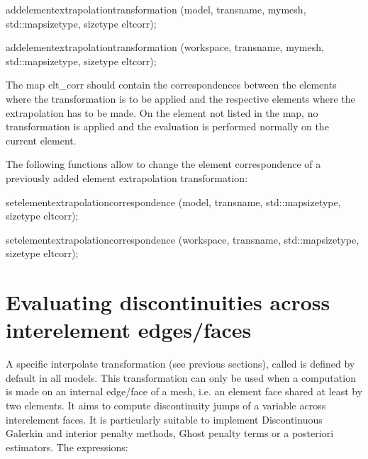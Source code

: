 \documentclass[a4paper,11pt,english]{sphinxmanual}
\begin{document}
\begin{sphinxVerbatim}[commandchars=\\\{\}]
add\PYGZus{}element\PYGZus{}extrapolation\PYGZus{}transformation
(model, transname, my\PYGZus{}mesh, std::map\PYGZlt{}size\PYGZus{}type, size\PYGZus{}type\PYGZgt{} \PYGZam{}elt\PYGZus{}corr);

add\PYGZus{}element\PYGZus{}extrapolation\PYGZus{}transformation
(workspace, transname, my\PYGZus{}mesh, std::map\PYGZlt{}size\PYGZus{}type, size\PYGZus{}type\PYGZgt{} \PYGZam{}elt\PYGZus{}corr);
\end{sphinxVerbatim}

The map elt\_corr should contain the correspondences between the elements where the transformation is to be applied and the respective elements where the extrapolation has to be made. On the element not listed in the map, no transformation is applied and the evaluation is performed normally on the current element.

The following functions allow to change the element correspondence of a previously added element extrapolation transformation:

\begin{sphinxVerbatim}[commandchars=\\\{\}]
set\PYGZus{}element\PYGZus{}extrapolation\PYGZus{}correspondence
(model, transname, std::map\PYGZlt{}size\PYGZus{}type, size\PYGZus{}type\PYGZgt{} \PYGZam{}elt\PYGZus{}corr);

set\PYGZus{}element\PYGZus{}extrapolation\PYGZus{}correspondence
(workspace, transname, std::map\PYGZlt{}size\PYGZus{}type, size\PYGZus{}type\PYGZgt{} \PYGZam{}elt\PYGZus{}corr);
\end{sphinxVerbatim}


\section{Evaluating discontinuities across inter\sphinxhyphen{}element edges/faces}
\label{\detokenize{userdoc/gasm_high:evaluating-discontinuities-across-inter-element-edges-faces}}\label{\detokenize{userdoc/gasm_high:ud-gasm-high-inter-elt-disc}}
A specific interpolate transformation (see previous sections), called  is defined by default in all models. This transformation can only be used when a computation is made on an internal edge/face of a mesh, i.e. an element face shared at least by two elements. It aims to compute discontinuity jumps of a variable across inter\sphinxhyphen{}element faces. It is particularly suitable to implement Discontinuous Galerkin and interior penalty methods, Ghost penalty terms or a posteriori estimators. The expressions:
\end{document}
